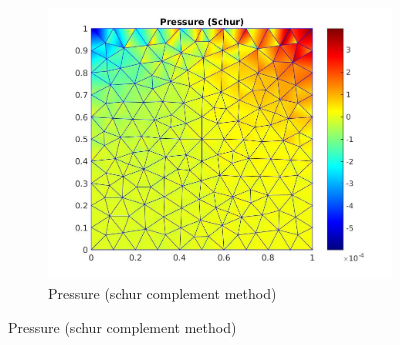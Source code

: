 \documentclass[a4paper]{book}
\begin{document}
\begin{figure}[H]
\begin{subfigure}{\textwidth}
  \includegraphics[width=\linewidth]{lid_schur_pressure.jpg}
  \caption{Pressure (schur complement method)}
  \label{pressure_stoke_schur_lid}
\end{subfigure}
\label{lid_driven_cavity}
\end{figure}
\end{document}

